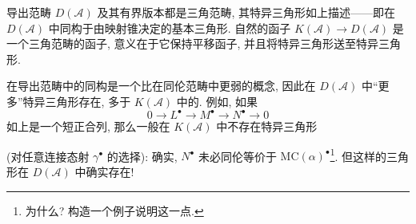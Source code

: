 导出范畴 $D(\mathcal{A})$ 及其有界版本都是三角范畴, 其特异三角形如上描述——即在 $D(\mathcal{A})$ 中同构于由映射锥决定的基本三角形. 自然的函子 $K(\mathcal{A})\to D(\mathcal{A})$ 是一个三角范畴的函子, 意义在于它保持平移函子, 并且将特异三角形送至特异三角形.

在导出范畴中的同构是一个比在同伦范畴中更弱的概念, 因此在 $D(\mathcal{A})$ 中“更多”特异三角形存在, 多于 $K(\mathcal{A})$ 中的. 例如, 如果
\[
0 \longrightarrow L^\bullet \longrightarrow M^\bullet \longrightarrow N^\bullet \longrightarrow 0
\]
如上是一个短正合列, 那么一般在 $K(\mathcal{A})$ 中不存在特异三角形
\begin{center}
\end{center}
(对任意连接态射 $\gamma^\bullet$ 的选择): 确实, $N^\bullet$ 未必同伦等价于 $\mathrm{MC}(\alpha)^\bullet$\footnote{为什么? 构造一个例子说明这一点.}. 但这样的三角形在 $D(\mathcal{A})$ 中确实存在!

